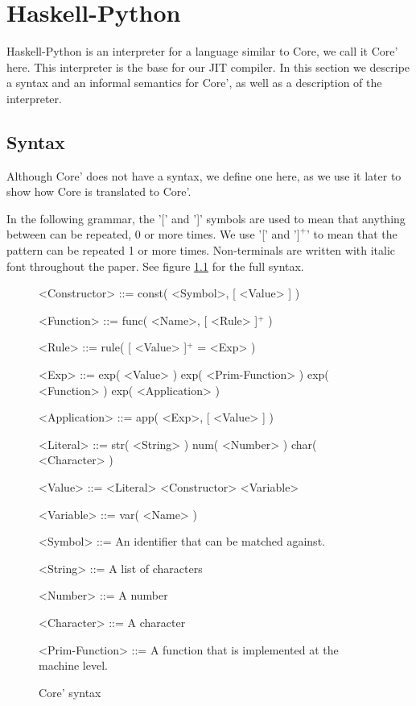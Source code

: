
\chapter{Haskell-Python}
\label{chap:hs}


Haskell-Python\cite{haskellpython}
is an interpreter for a language similar to Core, we call it Core' here.
This interpreter is the base for our JIT compiler. In this section we descripe a 
syntax and an informal semantics for Core', as well as a description of the 
interpreter.


\section{Syntax}
\label{sec:syntax}

Although Core' does not have a syntax, we define one here, as we use it later 
to show how Core is translated to Core'.

In the following grammar, the '[' and ']' symbols are used to mean that
anything between can be repeated, 0 or more times. We use '[' and '$]^+$' to 
mean that the pattern can be repeated 1 or more times. Non-terminals are 
written with italic font throughout the paper.
See figure \ref{gr:coresyn} for the full syntax.

\begin{figure}[H]
\centering

\begin{grammar}
<Constructor> ::= const( <Symbol>, [ <Value> ] )

<Function> ::= func( <Name>, [ <Rule> ]$^+$ )

<Rule> ::= rule( [ <Value> ]$^+$ = <Exp> )

<Exp> ::= exp( <Value> )
     \alt exp( <Prim-Function> )
     \alt exp( <Function> )
     \alt exp( <Application> )

<Application> ::= app( <Exp>, [ <Value> ] )

<Literal> ::= str( <String> )
	 \alt num( <Number> )
	 \alt char( <Character> )

<Value> ::= <Literal>
       \alt <Constructor>
       \alt <Variable>

<Variable> ::= var( <Name> )

<Symbol> ::= An identifier that can be matched against.

<String> ::= A list of characters

<Number> ::= A number

<Character> ::= A character

<Prim-Function> ::= A function that is implemented at the machine level.

\end{grammar}

\caption{Core' syntax}
\label{gr:coresyn}

\end{figure}

